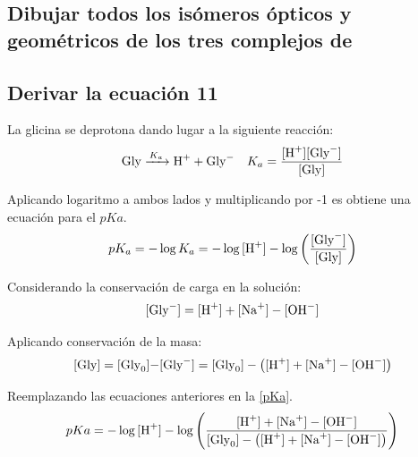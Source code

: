 \documentclass[fleqn,10pt]{SelfArx} %
\begin{document}
	\subsection{Dibujar todos los is\'omeros \'opticos y geom\'etricos de los tres complejos de}
	\subsubsection{\ce{[Ni(Gly^-)]^+}}
	\subsubsection{\ce{[Ni(Gly^-)_2]}}
	\subsubsection{\ce{[Ni(Gly^-)_3]^-}}
	
	\subsection{Derivar la ecuaci\'on 11}
	La glicina se deprotona dando lugar a la siguiente reacci\'on:
	\begin{equation}\label{Ka}
	\begin{array}{lr}
	\ce{Gly ->[K_a] H+ + Gly^-} & K_a = \dfrac{\ce{[H+][Gly^-]}}{\ce{[Gly]}}
	\end{array}
	\end{equation}
	
	Aplicando logaritmo a ambos lados y multiplicando por -1 es obtiene una ecuaci\'on para el $pKa$.
	\begin{equation}\label{pKa}
	pK_a = -\log K_a = -\log\ce{[H+]} - \log\left(\dfrac{\ce{[Gly^-]}}{\ce{[Gly]}}\right)
	\end{equation}
	
	Considerando la conservaci\'on de carga en la soluci\'on:
	\begin{equation}
		\ce{[Gly^-]} = \ce{[H+] + [Na+] - [OH^-]}
	\end{equation}
	
	Aplicando conservaci\'on de la masa:
	\footnotesize
	\begin{equation}
		\ce{[Gly]} = \ce{[Gly_0]-[Gly^-]} = \ce{[Gly_0]} - \left(\ce{[H+] + [Na+] - [OH^-]}\right)
	\end{equation}
	\normalsize
	
	\small
	Reemplazando las ecuaciones anteriores en la \autoref{pKa}.	
	\begin{equation*}
		pKa = -\log\ce{[H+]} - \log\left(\dfrac{\ce{[H+] + [Na+] - [OH^-]}}{\ce{[Gly_0]} - \left(\ce{[H+] + [Na+] - [OH^-]}\right)}\right)
	\end{equation*}
	\normalsize
	
\end{document}

